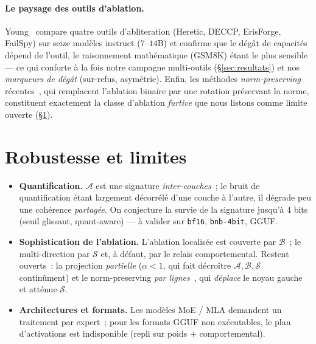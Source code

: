 \documentclass[11pt,a4paper]{article}
\theoremstyle{definition}
\theoremstyle{plain}
\begin{document}
\paragraph{Le paysage des outils d'ablation.}
Young~\cite{young2025} compare quatre outils d'abliteration (Heretic, DECCP, ErisForge,
FailSpy) sur seize modèles instruct ($7$--$14$B) et confirme que le dégât de capacités
dépend de l'outil, le raisonnement mathématique (GSM8K) étant le plus sensible — ce qui
conforte à la fois notre campagne multi-outils (\S\ref{sec:resultats}) et nos
\emph{marqueurs de dégât} (sur-refus, asymétrie). Enfin, les méthodes
\emph{norm-preserving} récentes~\cite{dang2026,grimjim}, qui remplacent l'ablation
\og binaire\fg{} par une rotation préservant la norme, constituent exactement la classe
d'ablation \emph{furtive} que nous listons comme limite ouverte (\S\ref{sec:robustesse}).

\section{Robustesse et limites}\label{sec:robustesse}
\begin{itemize}\itemsep2pt
  \item \textbf{Quantification.} $\mathcal{A}$ est une signature \emph{inter-couches}~;
  le bruit de quantification étant largement décorrélé d'une couche à l'autre, il
  dégrade peu une cohérence \emph{partagée}. On conjecture la survie de la signature
  jusqu'à $4$ bits (seuil glissant, \og quant-aware\fg{}) — à valider sur \texttt{bf16},
  \texttt{bnb-4bit}, GGUF.
  \item \textbf{Sophistication de l'ablation.} L'ablation localisée est couverte par
  $\mathcal{B}$~; le multi-direction par $\mathcal{S}$ et, à défaut, par le relais
  comportemental. Restent ouverts~: la projection \emph{partielle} ($\alpha<1$, qui fait
  décroître $\mathcal{A},\mathcal{B},\mathcal{S}$ continûment) et le norm-preserving
  \emph{par lignes}~\cite{dang2026,grimjim}, qui \emph{déplace} le noyau gauche et atténue
  $\mathcal{S}$.
  \item \textbf{Architectures et formats.} Les modèles MoE / MLA demandent un
  traitement par expert~; pour les formats GGUF non exécutables, le plan d'activations
  est indisponible (repli sur poids $+$ comportemental).
\end{itemize}
\end{document}
